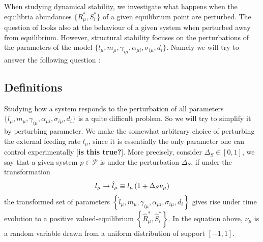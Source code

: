\documentclass[12pt, titlepage]{report}
\begin{document}
When studying dynamical stability, we investigate what happens when the equilibria abundances $\{R^*_\mu, S^*_i\}$ of a given equilibrium point are perturbed. The question of  looks also at the behaviour of a given system when perturbed away from equilibrium. However, structural stability focuses on the perturbations of the parameters of the model \ie  $\{l_\mu, m_\mu, \gamma_{i\mu}, \alpha_{\mu i}, \sigma_{i\mu},d_i\}$. Namely we will try to answer the following question :

\begin{centering}
\end{centering}

\subsection{Definitions}
Studying how a system responds to the perturbation of all parameters $\{l_\mu, m_\mu, \gamma_{i\mu}, \alpha_{\mu i}, \sigma_{i\mu},d_i\}$ is a quite difficult problem. So we will try to simplify it by perturbing  parameter. We make the somewhat arbitrary choice of perturbing the external feeding rate $l_\mu$, since it is essentially the only parameter one can control experimentally [\textbf{is this true?}]. More precisely, consider $\Delta_S \in [0,1]$, we say that a given system $p \in \mathcal{P}$ is  under the perturbation $\Delta_S$, if under the transformation
\begin{equation}
l_\mu \rightarrow \hat{l}_\mu \equiv l_\mu\left( 1+\Delta_S \nu_\mu \right)
\end{equation}
the transformed set of parameters $\left\{ \hat{l}_\mu, m_\mu, \gamma_{i\mu}, \alpha_{\mu i}, \sigma_{i\mu},d_i \right\}$ gives rise under time evolution to a positive valued-equilibrium $\left\{\hat{R}^*_\mu, \hat{S}^*_i\right\}$. In the equation above, $\nu_\mu$ is a random variable drawn from a uniform distribution of support $[-1, 1]$.
\end{document}
